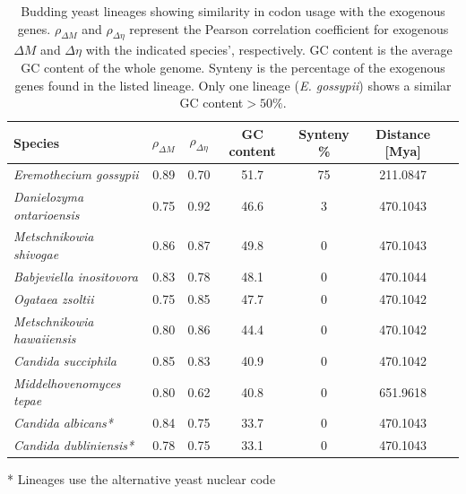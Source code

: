 \documentclass[doublespacing,linenumbers]{bmcart-modified}
\newcommand{\gossypii}{\textit{E. gossypii}\xspace}
\newcommand{\GC}{GC content\xspace}
\newcommand{\DM}{\ensuremath{{\Delta M}}\xspace}
\newcommand{\DE}{\ensuremath{{\Delta \eta}}\xspace}
\begin{document}
\begin{table}
  \centering
  \caption{Budding yeast lineages showing similarity in codon usage with the exogenous genes.
  $\rho_\DM$ and $\rho_\DE$ represent the Pearson correlation coefficient for exogenous \DM and \DE with the indicated species', respectively.
  \GC is the average \GC of the whole genome.
  Synteny is the percentage of the exogenous genes found in the listed lineage.
  Only one lineage (\gossypii) shows a similar \GC $> 50 \%$.}
  \begin{threeparttable}
  	\begin{tabular}{lcccccc}
    		\hline
    		Species & $\rho_\DM$ & $\rho_\DE$ & \GC & Synteny \%&  Distance [Mya] \\ \hline 
    		\emph{Eremothecium gossypii}			& 0.89 & 0.70 & 51.7 & 75 & 211.0847 \\
    		\emph{Danielozyma ontarioensis}			& 0.75 & 0.92 & 46.6 & 3   & 470.1043 \\
    		\emph{Metschnikowia shivogae}			& 0.86 & 0.87 & 49.8 & 0   & 470.1043 \\
    		\emph{Babjeviella inositovora}			& 0.83 & 0.78 & 48.1 & 0   & 470.1044 \\
    		\emph{Ogataea zsoltii}					& 0.75 & 0.85 & 47.7 & 0   & 470.1042 \\ 
    		\emph{Metschnikowia hawaiiensis}		& 0.80 & 0.86 & 44.4 & 0   & 470.1042 \\
    		\emph{Candida succiphila}	       			& 0.85 & 0.83 & 40.9 & 0   & 470.1042 \\ 
    		\emph{Middelhovenomyces tepae}		& 0.80 & 0.62 & 40.8 & 0   & 651.9618 \\ 
    		\emph{Candida albicans*}		   		& 0.84 & 0.75 & 33.7 & 0   & 470.1043 \\
   		\emph{Candida dubliniensis*}               		& 0.78 & 0.75 & 33.1 & 0   & 470.1043 \\ \hline
  	\end{tabular}
  	\begin{tablenotes}
    		\item[*] Lineages use the alternative yeast nuclear code %
 	 \end{tablenotes}
  \end{threeparttable}  
  \label{tab:source}
\end{table}
\end{document}
